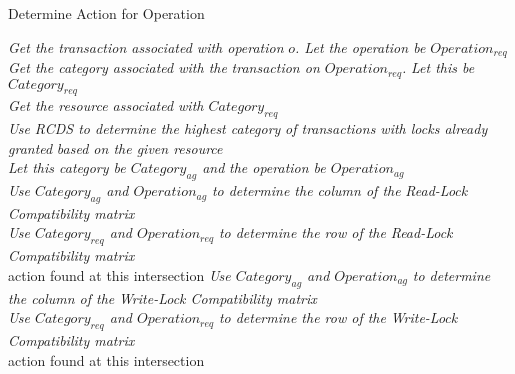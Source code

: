 \documentclass[conference]{IEEEtran}
\begin{document}
\begin{algorithm}
\caption{Determine Action for Operation}
\label{alg:get_operation_action}
\begin{algorithmic}[1]

    \State \textit{Get the transaction associated with operation}\label{alg1:begin}
    \State \textit{$o$. Let the operation be $Operation_{req}$}
    \\
    \State \textit{Get the category associated with the}
    \State \textit{transaction on $Operation_{req}$.} 
    \State \textit{Let this be $Category_{req}$}\label{alg1:cat_req}
    \\
    \State \textit{Get the resource associated with $Category_{req}$}\label{alg1:cat_res}
    \\
    \State \textit{Use RCDS to determine the highest category}
    \State \textit{of transactions with locks already granted}
    \State \textit{based on the given resource}
    \\
    \State \textit{Let this category be $Category_{ag}$ and}
    \State \textit{the operation be $Operation_{ag}$}\label{alg1:op_ag}
    \\
    \label{alg1:if}
        \State \textit{Use $Category_{ag}$ and $Operation_{ag}$}\label{alg1:top_if}
        \State \textit{to determine the column of the }
        \State \textit{Read-Lock Compatibility matrix}
        \\
        \State \textit{Use $Category_{req}$ and $Operation_{req}$}
        \State \textit{to determine the row of the }
        \State \textit{Read-Lock Compatibility matrix}\label{alg1:bot_if}
        \\
        \State \Return action found at this intersection \label{alg1:ret_if}
        \State \textit{Use $Category_{ag}$ and $Operation_{ag}$}\label{alg1:top_else}
        \State \textit{to determine the column of the }
        \State \textit{Write-Lock Compatibility matrix}
        \\
        \State \textit{Use $Category_{req}$ and $Operation_{req}$}
        \State \textit{to determine the row of the }
        \State \textit{Write-Lock Compatibility matrix}\label{alg1:bot_else}
        \\
        \State \Return action found at this intersection \label{alg1:ret_else}
    \EndIf
\EndFunction

\end{algorithmic}
\end{algorithm}
\end{document}

